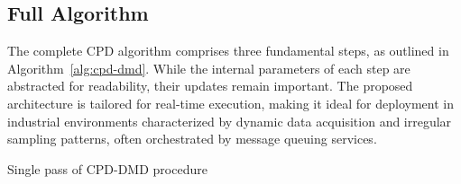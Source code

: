 \subsection{Full Algorithm}
The complete CPD algorithm comprises three fundamental steps, as outlined in Algorithm~\ref{alg:cpd-dmd}. While the internal parameters of each step are abstracted for readability, their updates remain important. The proposed architecture is tailored for real-time execution, making it ideal for deployment in industrial environments characterized by dynamic data acquisition and irregular sampling patterns, often orchestrated by message queuing services.

\begin{algorithm}
	\caption{Single pass of CPD-DMD procedure}\label{alg:cpd-dmd}
	\begin{algorithmic}[1]

	\end{algorithmic}
\end{algorithm}

